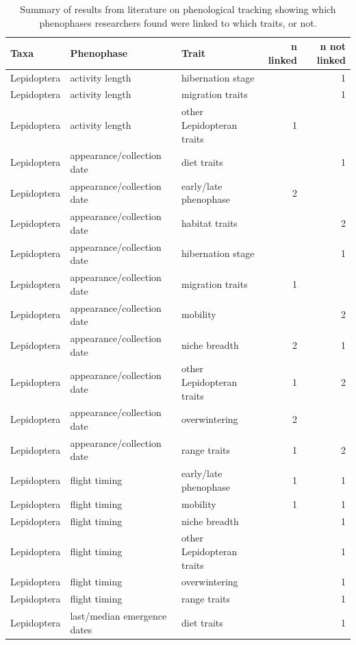 \documentclass[11pt,letter]{article}
\begin{document}
\begin{table}[ht]
\centering
\caption{Summary of results from literature on phenological tracking showing which phenophases researchers found were linked to which traits, or not.} 
\label{tab:meta2}
\begingroup\footnotesize
\begin{tabular}{lllrr}
  \hline
Taxa & Phenophase & Trait & n linked & n not linked \\ 
  \hline
Lepidoptera & activity length & hibernation stage &  &   1 \\ 
  Lepidoptera & activity length & migration traits &  &   1 \\ 
  Lepidoptera & activity length & other Lepidopteran traits &   1 &  \\ 
  Lepidoptera & appearance/collection date & diet traits &  &   1 \\ 
  Lepidoptera & appearance/collection date & early/late phenophase &   2 &  \\ 
  Lepidoptera & appearance/collection date & habitat traits &  &   2 \\ 
  Lepidoptera & appearance/collection date & hibernation stage &  &   1 \\ 
  Lepidoptera & appearance/collection date & migration traits &   1 &  \\ 
  Lepidoptera & appearance/collection date & mobility &  &   2 \\ 
  Lepidoptera & appearance/collection date & niche breadth &   2 &   1 \\ 
  Lepidoptera & appearance/collection date & other Lepidopteran traits &   1 &   2 \\ 
  Lepidoptera & appearance/collection date & overwintering &   2 &  \\ 
  Lepidoptera & appearance/collection date & range traits &   1 &   2 \\ 
  Lepidoptera & flight timing & early/late phenophase &   1 &   1 \\ 
  Lepidoptera & flight timing & mobility &   1 &   1 \\ 
  Lepidoptera & flight timing & niche breadth &  &   1 \\ 
  Lepidoptera & flight timing & other Lepidopteran traits &  &   1 \\ 
  Lepidoptera & flight timing & overwintering &  &   1 \\ 
  Lepidoptera & flight timing & range traits &  &   1 \\ 
  Lepidoptera & last/median emergence dates & diet traits &  &   1 \\ 

\end{tabular}
\end{table}
\end{document}
